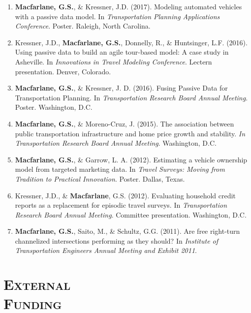 \documentclass[margin,line]{res}
\newif\ifdetail
\newcounter{enuminitialize}
\newenvironment{myenum}[1][]
{%
 \setcounter{enuminitialize}{#1}
 \addtocounter{enuminitialize}{2}
 \begin{enumerate}[left= 4pt, itemsep=8pt, start=\value{enuminitialize}, label=\arabic*\addtocounter{enumi}{-2}]
}
{%
 \end{enumerate}
}
\newcommand{\secfont}{\scshape }
\begin{document}
\begin{resume}
\begin{myenum}[35]
\item \textbf{Macfarlane, G.S.}, \& Kressner, J.D. (2017). Modeling automated vehicles with a passive data model. In \textit{ Transportation Planning Applications Conference}. Poster. Raleigh, North Carolina.
\item Kressner, J.D., \textbf{Macfarlane, G.S.}, Donnelly, R., \& Huntsinger, L.F. (2016). Using passive data to build an agile tour-based model: A case study in Asheville. In \textit{ Innovations in Travel Modeling Conference}. Lectern presentation. Denver, Colorado. \ifdetail Citations: 7  \fi
\item \textbf{Macfarlane, G.S.}, \& Kressner, J. D. (2016). Fusing Passive Data for Transportation Planning. In \textit{ Transportation Research Board Annual Meeting}. Poster. Washington, D.C.
\item \textbf{Macfarlane, G.S.}, \& Moreno-Cruz, J. (2015). The association between public transportation infrastructure and home price growth and stability. \textit{ In Transportation Research Board Annual Meeting}. Washington, D.C.
\item \textbf{Macfarlane, G.S.}, \& Garrow, L. A. (2012). Estimating a vehicle ownership model from targeted marketing data. In \textit{ Travel Surveys: Moving from Tradition to Practical Innovation}. Poster. Dallas, Texas.
\item Kressner, J.D., \& \textbf{Macfarlane}, G.S. (2012). Evaluating household credit reports as a replacement for episodic travel surveys. In \textit{ Transportation Research Board Annual Meeting}. Committee presentation. Washington, D.C.
\item \textbf{Macfarlane, G.S.}, Saito, M., \& Schultz, G.G. (2011). Are free right-turn channelized intersections performing as they should? In \textit{ Institute of Transportation Engineers Annual Meeting and Exhibit 2011}.
\end{myenum}



\noindent\makebox[\linewidth]{\rule{\linewidth}{0.4pt}}
\section{\secfont External \\Funding}


\end{resume}
\end{document}
